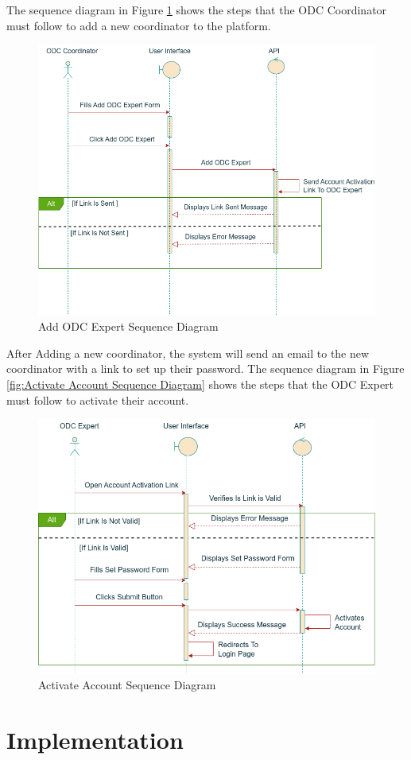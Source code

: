 The sequence diagram in Figure \ref{fig:Add ODC Expert Sequence Diagram} shows
the steps that the ODC Coordinator must follow to add a new coordinator to the
platform.

\begin{figure}[h!]
    \centering
    \includegraphics[width=1\textwidth]{images/sequenceAddODCExpert.png}
    \caption{Add ODC Expert Sequence Diagram}
    \label{fig:Add ODC Expert Sequence Diagram}
\end{figure}

\newpage
After Adding a new coordinator, the system will send an email to the new coordinator with a link to set up their password.
The sequence diagram in Figure \ref{fig:Activate Account Sequence Diagram} shows the steps that the ODC Expert must follow
to activate their account.

\begin{figure}[h!]
    \centering
    \includegraphics[width=1\textwidth]{images/sequenceActivateAccount.png}
    \caption{Activate Account Sequence Diagram}
    \label{fig:Active Account Sequence Diagram}
\end{figure}

\section{Implementation}
